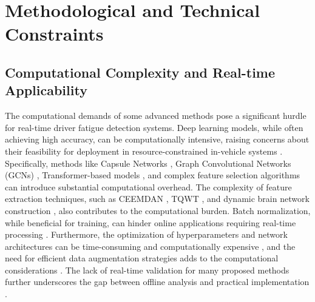 \section{Methodological and Technical Constraints}

\subsection{Computational Complexity and Real-time Applicability}
The computational demands of some advanced methods pose a significant hurdle for real-time driver fatigue detection systems.  Deep learning models, while often achieving high accuracy, can be computationally intensive, raising concerns about their feasibility for deployment in resource-constrained in-vehicle systems \citep{Balam_V_2021, Budak_U_2019, Gao_D_2023, Jia_H_2023, Ko_W_2020, Xie_H_2024, Ye_H_2024, Zhang_W_2020, Alghanim_M_2024, Chen_K_2024, Gong_P_2024, He_L_2024}.  Specifically, methods like Capsule Networks \citep{Pan_J_2023}, Graph Convolutional Networks (GCNs) \citep{Chen_K_2024, Xie_H_2024}, Transformer-based models \citep{Wang_J_2022, Zhang_J_2025}, and complex feature selection algorithms \citep{Tuncer_T_2021_1, Zeng_H_2021} can introduce substantial computational overhead.  The complexity of feature extraction techniques, such as CEEMDAN \citep{Liu_Y_2024}, TQWT \citep{Bajaj_V_2020, Budak_U_2019}, and dynamic brain network construction \citep{Lin_Z_2021}, also contributes to the computational burden.  Batch normalization, while beneficial for training, can hinder online applications requiring real-time processing \citep{Cui_J_2022}.  Furthermore, the optimization of hyperparameters and network architectures can be time-consuming and computationally expensive \citep{Li_R_2023_1, Yang_Y_2021, Zhao_Y_2023, Alghanim_M_2024}, and the need for efficient data augmentation strategies adds to the computational considerations \citep{Alghanim_M_2024, Seo_P_2024}.  The lack of real-time validation for many proposed methods further underscores the gap between offline analysis and practical implementation \citep{Bajaj_V_2020, Bajaj_S_2022, Cui_J_2022, Darojatun_A_2023, Qin_Y_2022, Vinod_K_2022, Vinod_S_2022, Ma_Y_2019, Nguyen_T_2017}.

